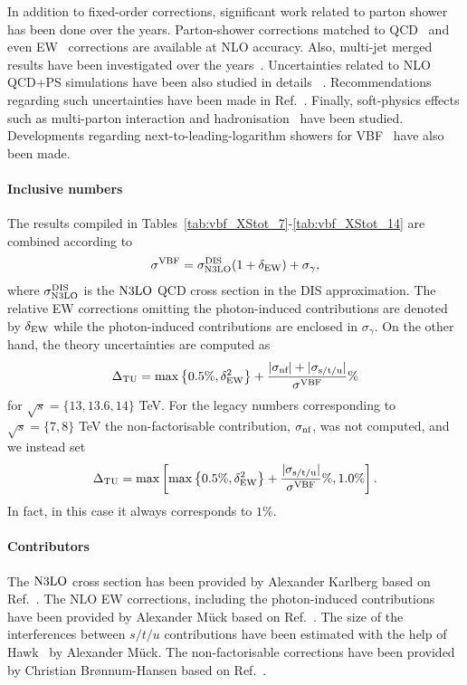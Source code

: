 In addition to fixed-order corrections, significant work related to parton shower has been done over the years.
Parton-shower corrections matched to QCD~\cite{Nason:2009ai,Frixione:2013mta} and even EW~\cite{Jager:2022acp} corrections are available at NLO accuracy.
Also, multi-jet merged results have been investigated over the years~\cite{Hoche:2021mkv,Chen:2021phj}.
Uncertainties related to NLO QCD+PS simulations have been also studied in details ~\cite{Jager:2020hkz,Buckley:2021gfw,Hoche:2021mkv}.
Recommendations regarding such uncertainties have been made in Ref.~\cite{TOBEADDED}.
Finally, soft-physics effects such as multi-parton interaction and hadronisation~\cite{Hoche:2021mkv,Bittrich:2021ztq} have been studied.
Developments regarding next-to-leading-logarithm showers for VBF~\cite{vanBeekveld:2023chs} have also been made.

\paragraph{Inclusive numbers}

The results compiled in Tables~\ref{tab:vbf_XStot_7}-\ref{tab:vbf_XStot_14} are combined according to
\begin{align}
  \label{eq:vbf-xsec-combined}
  \sigma^{\mathrm{VBF}} = \sigma_{\mathrm{N3LO}}^{\mathrm{DIS}} (1+\delta_{\mathrm{EW}}) + \sigma_{\gamma} ,
\end{align}
%
where $\sigma_{\mathrm{N3LO}}^{\mathrm{DIS}}$ is the $\mathrm{N3LO}$ QCD cross section in the DIS approximation.
The relative EW corrections omitting the photon-induced contributions are denoted by $\delta_{\mathrm{EW}}$ while the photon-induced contributions are enclosed in $\sigma_{\gamma}$.
On the other hand, the theory uncertainties are computed as
\begin{align}
  \label{eq:vbf-TU}
  \Delta_{\mathrm{TU}} = \max\left\{0.5\%,\delta_{\mathrm{EW}}^2\right\} + \frac{|\sigma_{\mbox{\scriptsize nf}}| + |\sigma_{\mbox{\scriptsize s/t/u}}|}{\sigma^{\mathrm{VBF}}}\%
\end{align}
for $\sqrt{s}=\{13,13.6,14\}$ TeV. For the legacy numbers corresponding to $\sqrt{s}=\{7,8\}$ TeV the non-factorisable contribution, $\sigma_{\mbox{\scriptsize nf}}$, was not computed, and we instead set
\begin{align}
  \label{eq:vbf-TU}
  \Delta_{\mathrm{TU}} = \max\left[\max\left\{0.5\%,\delta_{\mathrm{EW}}^2\right\} + \frac{|\sigma_{\mbox{\scriptsize s/t/u}}|}{\sigma^{\mathrm{VBF}}}\%,1.0\%\right].
\end{align}
In fact, in this case it always corresponds to $1\%$.

\paragraph{Contributors}

The $\mathrm{N3LO}$ cross section has been provided by Alexander Karlberg based on Ref.~\cite{Dreyer:2016oyx}.
The NLO EW corrections, including the photon-induced contributions have been provided by Alexander M\"uck based on Ref.~\cite{Denner:2014cla}.
The size of the interferences between $s/t/u$ contributions have been estimated with the help of {\sc Hawk}~\cite{Denner:2014cla} by Alexander Mück.
The non-factorisable corrections have been provided by Christian Br{\o}nnum-Hansen based on Ref.~\cite{????}.
